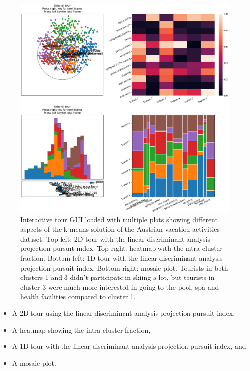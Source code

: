 \documentclass[article]{ajs}
\begin{document}
\begin{figure}[h!]
    \centering
    \includegraphics[width=1\textwidth]{winter_cl7_init.png}
    \caption{Interactive tour GUI loaded with multiple plots showing different aspects of the k-means solution of the Austrian vacation activities dataset. Top left: 2D tour with the linear discriminant analysis projection pursuit index. Top right: heatmap with the intra-cluster fraction. Bottom left: 1D tour with the linear discriminant analysis projection pursuit index. Bottom right: mosaic plot. Tourists in both clusters 1 and 3 didn't participate in skiing a lot, but tourists in cluster 3 were much more interested in going to the pool, spa and health facilities compared to cluster 1.}
    \label{fig:winter_cl7_init}
\end{figure}

\begin{itemize}
    \item A 2D tour using the linear discriminant analysis projection pursuit index,
    \item A heatmap showing the intra-cluster fraction,
    \item A 1D tour with the linear discriminant analysis projection pursuit index, and
    \item A mosaic plot.
\end{itemize}
\end{document}
